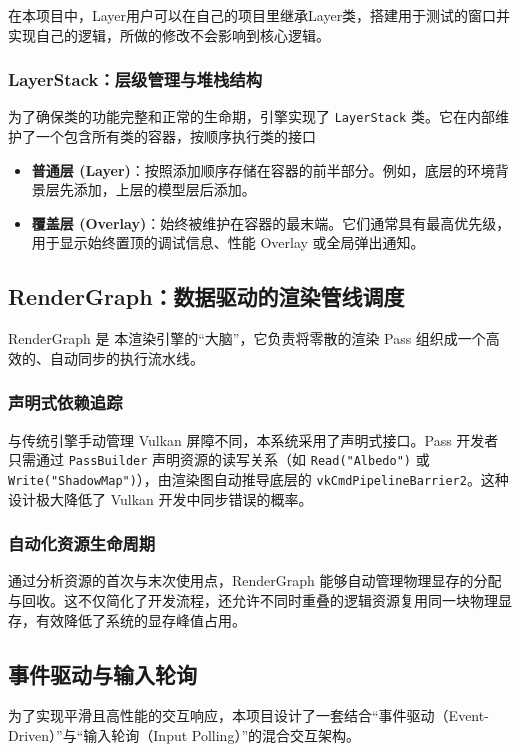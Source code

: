 在本项目中，Layer用户可以在自己的项目里继承Layer类，搭建用于测试的窗口并实现自己的逻辑，所做的修改不会影响到核心逻辑。

\subsubsection{LayerStack：层级管理与堆栈结构}
为了确保类的功能完整和正常的生命期，引擎实现了 \texttt{LayerStack} 类。它在内部维护了一个包含所有类的容器，按顺序执行类的接口
\begin{itemize}
    \item \textbf{普通层 (Layer)}：按照添加顺序存储在容器的前半部分。例如，底层的环境背景层先添加，上层的模型层后添加。
    \item \textbf{覆盖层 (Overlay)}：始终被维护在容器的最末端。它们通常具有最高优先级，用于显示始终置顶的调试信息、性能 Overlay 或全局弹出通知。
\end{itemize}

\subsection{RenderGraph：数据驱动的渲染管线调度}
RenderGraph 是 本渲染引擎的“大脑”，它负责将零散的渲染 Pass 组织成一个高效的、自动同步的执行流水线。

\subsubsection{声明式依赖追踪}
与传统引擎手动管理 Vulkan 屏障不同，本系统采用了声明式接口。Pass 开发者只需通过 \texttt{PassBuilder} 声明资源的读写关系（如 \texttt{Read("Albedo")} 或 \texttt{Write("ShadowMap")}），由渲染图自动推导底层的 \texttt{vkCmdPipelineBarrier2}。这种设计极大降低了 Vulkan 开发中同步错误的概率。

\subsubsection{自动化资源生命周期}
通过分析资源的首次与末次使用点，RenderGraph 能够自动管理物理显存的分配与回收。这不仅简化了开发流程，还允许不同时重叠的逻辑资源复用同一块物理显存，有效降低了系统的显存峰值占用。

\subsection{事件驱动与输入轮询}

为了实现平滑且高性能的交互响应，本项目设计了一套结合“事件驱动（Event-Driven）”与“输入轮询（Input Polling）”的混合交互架构。


